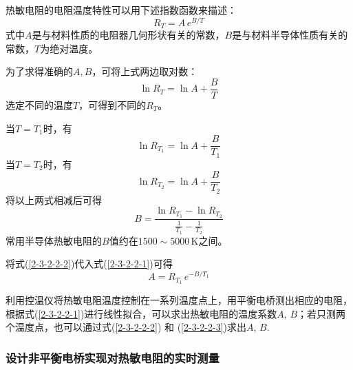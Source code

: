 \documentclass[UTF8]{article}
\theoremstyle{MyLineTheoremStyle} %
\theoremstyle{MyBlockTheoremStyle} %
\theoremstyle{MySubsubsectionStyle} %
\begin{document}
热敏电阻的电阻温度特性可以用下述指数函数来描述：
\begin{equation}
R_T=A\,e^{B/T}
\end{equation}
式中$ A $是与材料性质的电阻器几何形状有关的常数，$ B $是与材料半导体性质有关的常数，$ T $为绝对温度。

为了求得准确的$ A,B $，可将上式两边取对数：
\begin{equation}\label{2-3-2-2-1}
    \ln R_T=\ln A+\frac BT
\end{equation}
选定不同的温度$ T $，可得到不同的$ R_T $。

当$ T=T_1 $时，有
\begin{equation}
\ln R_{T_1}=\ln A+\frac{B}{T_1}
\end{equation}
当$ T=T_2 $时，有
\begin{equation}
\ln R_{T_2}=\ln A+\frac{B}{T_2}
\end{equation}
将以上两式相减后可得
\begin{equation}\label{2-3-2-2-2}
    B=\frac{\ln R_{T_1}-\ln R_{T_2}}{\frac{1}{T_1}-\frac{1}{T_2}}
\end{equation}
常用半导体热敏电阻的$ B $值约在$ 1500\sim 5000\,\mathrm K $之间。

将式(\ref{2-3-2-2-2})代入式(\ref{2-3-2-2-1})可得
\begin{equation}\label{2-3-2-2-3}
    A=R_{T_1}\,e^{-B/T_1}
\end{equation}

利用控温仪将热敏电阻温度控制在一系列温度点上，用平衡电桥测出相应的电阻，根据式(\ref{2-3-2-2-1})进行线性拟合，可以求出热敏电阻的温度系数$ A,\,B $；若只测两个温度点，也可以通过式(\ref{2-3-2-2-2}) 和 (\ref{2-3-2-2-3})求出$ A,\,B $.




\subsubsection{设计非平衡电桥实现对热敏电阻的实时测量}
\end{document}
